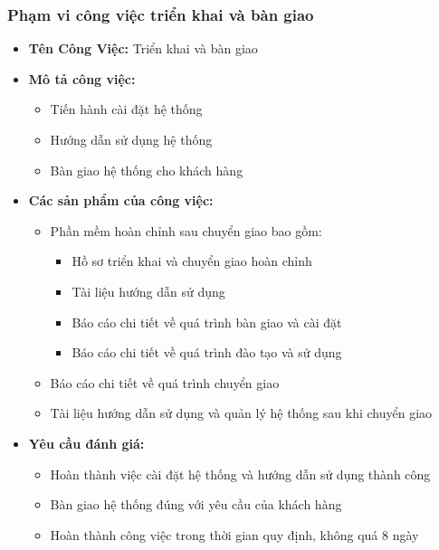 \subsubsection{Phạm vi công việc triển khai và bàn giao}
\begin{itemize}
    \item \textbf{Tên Công Việc:} Triển khai và bàn giao
    \item \textbf{Mô tả công việc:}
    \begin{itemize}
        \item Tiến hành cài đặt hệ thống
        \item Hướng dẫn sử dụng hệ thống
        \item Bàn giao hệ thống cho khách hàng
    \end{itemize}
    \item \textbf{Các sản phẩm của công việc:}
    \begin{itemize}
        \item Phần mềm hoàn chỉnh sau chuyển giao bao gồm:
        \begin{itemize}
            \item Hồ sơ triển khai và chuyển giao hoàn chỉnh
            \item Tài liệu hướng dẫn sử dụng
            \item Báo cáo chi tiết về quá trình bàn giao và cài đặt
            \item Báo cáo chi tiết về quá trình đào tạo và sử dụng
        \end{itemize}
        \item Báo cáo chi tiết về quá trình chuyển giao
        \item Tài liệu hướng dẫn sử dụng và quản lý hệ thống sau khi chuyển giao
    \end{itemize}
    \item \textbf{Yêu cầu đánh giá:}
    \begin{itemize}
        \item Hoàn thành việc cài đặt hệ thống và hướng dẫn sử dụng thành công
        \item Bàn giao hệ thống đúng với yêu cầu của khách hàng
        \item Hoàn thành công việc trong thời gian quy định, không quá 8 ngày
    \end{itemize}
\end{itemize}

